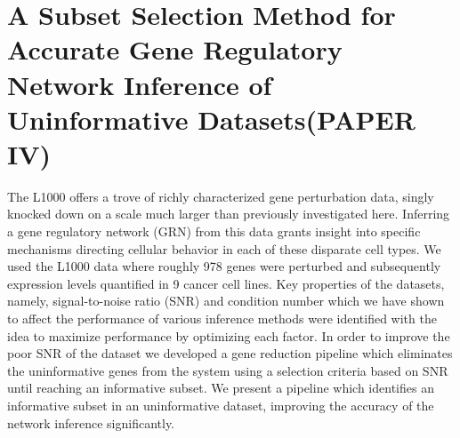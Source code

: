 

\section{A Subset Selection Method for Accurate Gene Regulatory Network Inference of Uninformative Datasets(PAPER IV)}

The L1000 offers a trove of richly characterized gene perturbation data, singly knocked down on a scale much larger than previously investigated here. Inferring a gene regulatory network (GRN) from this data grants insight into specific mechanisms directing cellular behavior in each of these disparate cell types. We used the L1000 data where roughly 978 genes were perturbed and subsequently expression levels quantified in 9 cancer cell lines. Key properties of the datasets, namely, signal-to-noise ratio (SNR) and condition number which we have shown to affect the performance of various inference methods were identified with the idea to maximize performance by optimizing each factor. 
In order to improve the poor SNR of the dataset we developed a gene reduction pipeline which eliminates the uninformative genes from the system using a selection criteria based on SNR until reaching an informative subset. We present a pipeline which identifies an informative subset in an uninformative dataset, improving the accuracy of the network inference significantly.